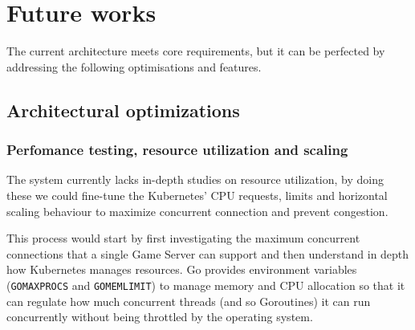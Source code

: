 \documentclass{scrartcl}
\begin{document}
\section{Future works}\label{future-works}
The current architecture meets core requirements, but it can be perfected by addressing the following optimisations and features.
\subsection{Architectural optimizations}
\subsubsection*{Perfomance testing, resource utilization and scaling}
The system currently lacks in-depth studies on resource utilization, by doing these we could fine-tune the Kubernetes' CPU requests, limits
and horizontal scaling behaviour to maximize concurrent connection and prevent congestion.

This process would start by first investigating the maximum concurrent connections that a single Game Server can support and then
understand in depth how Kubernetes manages resources. Go provides environment variables (\texttt{GOMAXPROCS} and \texttt{GOMEMLIMIT}) to manage memory and CPU allocation so that
it can regulate how much concurrent threads (and so Goroutines) it can run concurrently without being throttled by the operating system.
\end{document}
